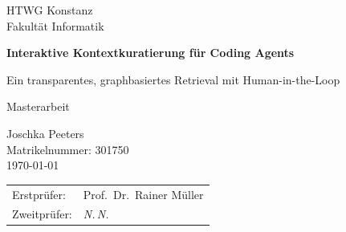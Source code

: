 \begin{titlepage}
  \centering

  \large{HTWG Konstanz}\\
  \normalsize{Fakultät Informatik}

  \vfill

  {\LARGE\bfseries Interaktive Kontextkuratierung für Coding Agents\par}

  \vspace{0.6cm}

  {\large Ein transparentes, graphbasiertes Retrieval mit Human-in-the-Loop\par}

  \vspace{1.2cm}

  {\large Masterarbeit}

  \vspace{2cm}

  {\large Joschka Peeters}\\[0.5em]
  {\normalsize Matrikelnummer: 301750}\\[0.5em]
  {\normalsize \today} %

  \vfill

  \begin{tabular}{ll}
    Erstprüfer:  & Prof.\ Dr.\ Rainer Müller \\
    Zweitprüfer: & \textit{N.\,N.} \\ %
  \end{tabular}

\end{titlepage}
